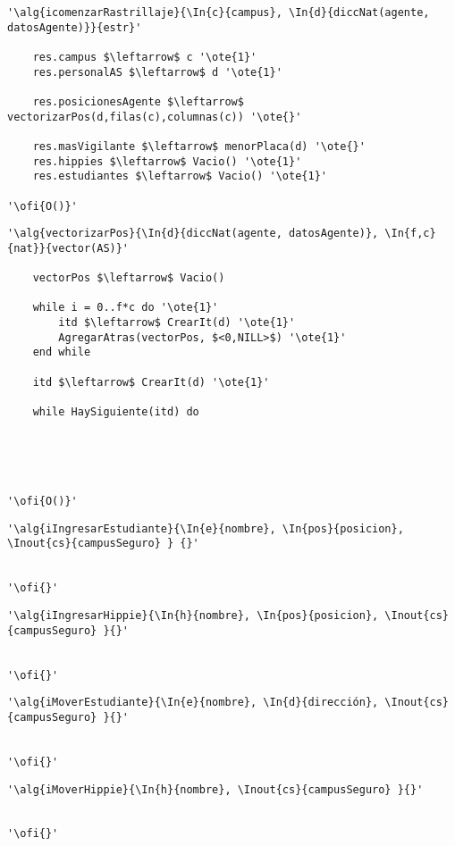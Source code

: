 \lstset{style=alg}

\begin{lstlisting}[mathescape]
'\alg{icomenzarRastrillaje}{\In{c}{campus}, \In{d}{diccNat(agente, datosAgente)}}{estr}' 

	res.campus $\leftarrow$ c '\ote{1}'
	res.personalAS $\leftarrow$ d '\ote{1}'
	
	res.posicionesAgente $\leftarrow$ vectorizarPos(d,filas(c),columnas(c)) '\ote{}'

	res.masVigilante $\leftarrow$ menorPlaca(d) '\ote{}'
	res.hippies $\leftarrow$ Vacio() '\ote{1}'
	res.estudiantes $\leftarrow$ Vacio() '\ote{1}'

'\ofi{O()}'
\end{lstlisting}

\begin{lstlisting}[mathescape]
'\alg{vectorizarPos}{\In{d}{diccNat(agente, datosAgente)}, \In{f,c}{nat}}{vector(AS)}'
	
	vectorPos $\leftarrow$ Vacio()
	
	while i = 0..f*c do '\ote{1}'
		itd $\leftarrow$ CrearIt(d) '\ote{1}'
		AgregarAtras(vectorPos, $<0,NILL>$) '\ote{1}'
	end while

	itd $\leftarrow$ CrearIt(d) '\ote{1}'

	while HaySiguiente(itd) do
		
	



'\ofi{O()}'
\end{lstlisting}

\begin{lstlisting}[mathescape]
'\alg{iIngresarEstudiante}{\In{e}{nombre}, \In{pos}{posicion}, \Inout{cs}{campusSeguro} } {}'

	
'\ofi{}'
\end{lstlisting}

\begin{lstlisting}[mathescape]
'\alg{iIngresarHippie}{\In{h}{nombre}, \In{pos}{posicion}, \Inout{cs}{campusSeguro} }{}'

	
'\ofi{}'
\end{lstlisting}

\begin{lstlisting}[mathescape]
'\alg{iMoverEstudiante}{\In{e}{nombre}, \In{d}{dirección}, \Inout{cs}{campusSeguro} }{}'

	
'\ofi{}'
\end{lstlisting}

\begin{lstlisting}[mathescape]
'\alg{iMoverHippie}{\In{h}{nombre}, \Inout{cs}{campusSeguro} }{}'

	
'\ofi{}'
\end{lstlisting}

